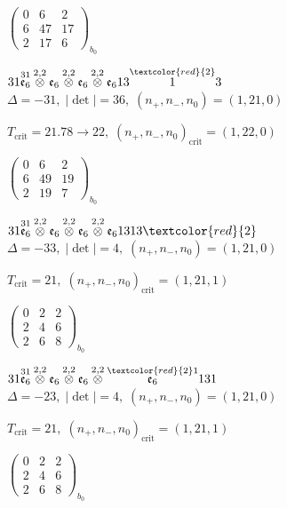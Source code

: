 \documentclass[10pt]{article}
\begin{document}
\hspace{2em}$\left(\begin{smallmatrix}0 & 6 & 2 \\ 6 & 47 & 17 \\ 2 & 17 & 6\end{smallmatrix}\right)_{\!b_0}$

$31\overset{31}{\mathfrak{e}_6}\overset{2,2}{\otimes}\mathfrak{e}_6\overset{2,2}{\otimes}\mathfrak{e}_6\overset{2,2}{\otimes}\mathfrak{e}_613\overset{\textcolor{red}{2}}{1}3$ \quad $\Delta=-31,\; |\det|=36,\; (n_+,n_-,n_0)=(1,21,0)$

\hspace{1em}$T_{\text{crit}}=21.78 \to 22,\; (n_+,n_-,n_0)_{\text{crit}}=(1,22,0)$

\hspace{2em}$\left(\begin{smallmatrix}0 & 6 & 2 \\ 6 & 49 & 19 \\ 2 & 19 & 7\end{smallmatrix}\right)_{\!b_0}$

$31\overset{31}{\mathfrak{e}_6}\overset{2,2}{\otimes}\mathfrak{e}_6\overset{2,2}{\otimes}\mathfrak{e}_6\overset{2,2}{\otimes}\mathfrak{e}_61313\textcolor{red}{2}$ \quad $\Delta=-33,\; |\det|=4,\; (n_+,n_-,n_0)=(1,21,0)$

\hspace{1em}$T_{\text{crit}}=21,\; (n_+,n_-,n_0)_{\text{crit}}=(1,21,1)$

\hspace{2em}$\left(\begin{smallmatrix}0 & 2 & 2 \\ 2 & 4 & 6 \\ 2 & 6 & 8\end{smallmatrix}\right)_{\!b_0}$

\smallskip

$31\overset{31}{\mathfrak{e}_6}\overset{2,2}{\otimes}\mathfrak{e}_6\overset{2,2}{\otimes}\mathfrak{e}_6\overset{2,2}{\otimes}\overset{\textcolor{red}{2}1}{\mathfrak{e}_6}131$ \quad $\Delta=-23,\; |\det|=4,\; (n_+,n_-,n_0)=(1,21,0)$

\hspace{1em}$T_{\text{crit}}=21,\; (n_+,n_-,n_0)_{\text{crit}}=(1,21,1)$

\hspace{2em}$\left(\begin{smallmatrix}0 & 2 & 2 \\ 2 & 4 & 6 \\ 2 & 6 & 8\end{smallmatrix}\right)_{\!b_0}$
\end{document}

